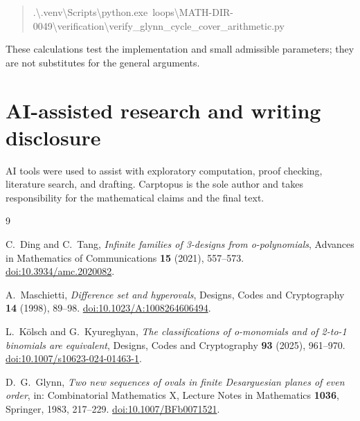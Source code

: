\documentclass[11pt]{article}
\begin{document}
\begin{quote}\footnotesize\ttfamily
.\textbackslash{}\allowbreak{}.venv\textbackslash{}\allowbreak{}Scripts\textbackslash{}\allowbreak{}python.exe\ \allowbreak{}loops\textbackslash{}\allowbreak{}MATH-\allowbreak{}DIR-\allowbreak{}0049\textbackslash{}\allowbreak{}verification\textbackslash{}\allowbreak{}verify\_\allowbreak{}glynn\_\allowbreak{}cycle\_\allowbreak{}cover\_\allowbreak{}arithmetic.py\par
\end{quote}


These calculations test the implementation and small admissible parameters;
they are not substitutes for the general arguments.

\section*{AI-assisted research and writing disclosure}


AI tools were used to assist with exploratory computation, proof checking,
literature search, and drafting. Carptopus is the sole author and takes
responsibility for the mathematical claims and the final text.

\begin{thebibliography}{9}
\footnotesize
\raggedright

C.~Ding and C.~Tang,
\emph{Infinite families of 3-designs from o-polynomials},
Advances in Mathematics of Communications \textbf{15} (2021), 557--573.
\href{https://doi.org/10.3934/amc.2020082}{doi:10.3934/amc.2020082}.

A.~Maschietti,
\emph{Difference set and hyperovals},
Designs, Codes and Cryptography \textbf{14} (1998), 89--98.
\href{https://doi.org/10.1023/A:1008264606494}{doi:10.1023/A:1008264606494}.

L.~K\"olsch and G.~Kyureghyan,
\emph{The classifications of o-monomials and of 2-to-1 binomials are equivalent},
Designs, Codes and Cryptography \textbf{93} (2025), 961--970.
\href{https://doi.org/10.1007/s10623-024-01463-1}{doi:10.1007/s10623-024-01463-1}.

D.~G.~Glynn,
\emph{Two new sequences of ovals in finite Desarguesian planes of even order},
in: Combinatorial Mathematics X, Lecture Notes in Mathematics \textbf{1036},
Springer, 1983, 217--229.
\href{https://doi.org/10.1007/BFb0071521}{doi:10.1007/BFb0071521}.

\end{thebibliography}
\end{document}
